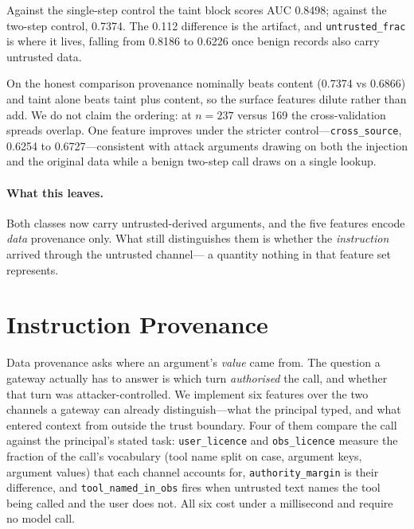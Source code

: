 \documentclass[11pt]{article}
\begin{document}


Against the single-step control the taint block scores AUC 0.8498; against
the two-step control, 0.7374. The 0.112 difference is the artifact, and
\texttt{untrusted\_frac} is where it lives, falling from 0.8186 to
0.6226 once benign records also carry untrusted data.

On the honest comparison provenance nominally beats content (0.7374 vs
0.6866) and taint alone beats taint plus content, so the surface features
dilute rather than add. We do not claim the ordering: at $n=237$ versus
169 the cross-validation spreads overlap. One feature improves under the
stricter control---\texttt{cross\_source}, 0.6254 to 0.6727---consistent
with attack arguments drawing on both the injection and the original
data while a benign two-step call draws on a single lookup.

\paragraph{What this leaves.}
Both classes now carry untrusted-derived arguments, and the five features
encode \emph{data} provenance only. What still distinguishes them is
whether the \emph{instruction} arrived through the untrusted channel---
a quantity nothing in that feature set represents.

\section{Instruction Provenance}
\label{sec:instprov}



Data provenance asks where an argument's \emph{value} came from.
The question a gateway actually has to answer is which turn
\emph{authorised} the call, and whether that turn was attacker-controlled.
We implement six features over the two channels a gateway can already
distinguish---what the principal typed, and what entered context from
outside the trust boundary. Four of them compare the call against the
principal's stated task: \texttt{user\_licence} and \texttt{obs\_licence}
measure the fraction of the call's vocabulary (tool name split on case,
argument keys, argument values) that each channel accounts for,
\texttt{authority\_margin} is their difference, and
\texttt{tool\_named\_in\_obs} fires when untrusted text names the tool
being called and the user does not. All six cost under a millisecond and
require no model call.
\end{document}
